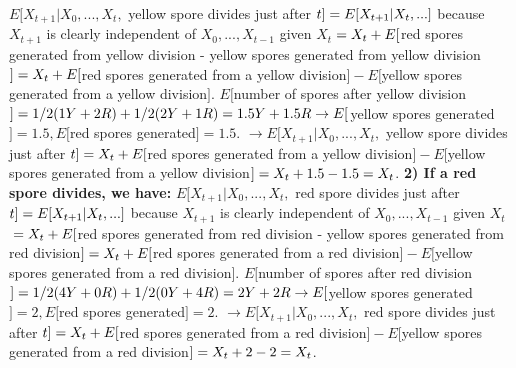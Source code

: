 \documentclass[12pt]{article}
\begin{document}
$E[X_{t+1} | X_0, ..., X_t,$ yellow spore divides just after $t] \newline = E[X_{t+1} | X_t, ...] $ because $X_{t+1}$ is clearly independent of $X_0, ..., X_{t-1}$ given $X_t$$
 \newline= X_t + E[$red spores generated from yellow division - yellow spores generated from yellow division$] 
\newline= X_t + E[$red spores generated from a yellow division$] - E[$yellow spores generated from a yellow division$]$.
\newline
\newline
$E[$number of spores after yellow division$] = 1/2(1Y + 2R) + 1/2(2Y + 1R) = 1.5Y + 1.5R \newline \rightarrow E[$yellow spores generated$] = 1.5, E[$red spores generated$] = 1.5$.
\newline
\newline
$\rightarrow E[X_{t+1} | X_0, ..., X_t,$ yellow spore divides just after $t]
\newline = X_t + E[$red spores generated from a yellow division$] - E[$yellow spores generated from a yellow division$]
\newline = X_t + 1.5 - 1.5 = X_t$.
\newline
\newline
\textbf{2) If a red spore divides, we have:}
\newline
$E[X_{t+1} | X_0, ..., X_t,$ red spore divides just after $t] \newline = E[X_{t+1} | X_t, ...] $ because $X_{t+1}$ is clearly independent of $X_0, ..., X_{t-1}$ given $X_t$$
\newline= X_t + E[$red spores generated from red division - yellow spores generated from red division$] 
\newline= X_t + E[$red spores generated from a red division$] - E[$yellow spores generated from a red division$]$.
\newline
\newline
$E[$number of spores after red division$] = 1/2(4Y + 0R) + 1/2(0Y + 4R) = 2Y + 2R \newline \rightarrow E[$yellow spores generated$] = 2, E[$red spores generated$] = 2$.
\newline
\newline
$\rightarrow E[X_{t+1} | X_0, ..., X_t,$ red spore divides just after $t]
\newline = X_t + E[$red spores generated from a red division$] - E[$yellow spores generated from a red division$]
\newline = X_t + 2 - 2 = X_t$.
\end{document}
